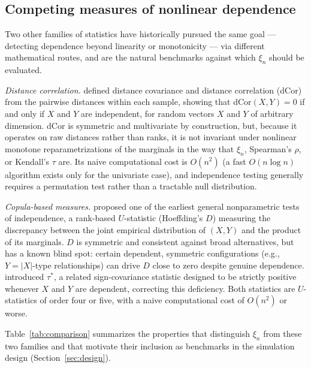 \documentclass[article]{ajs}
\begin{document}
\subsection{Competing measures of nonlinear dependence}

Two other families of statistics have historically pursued the same
goal --- detecting dependence beyond linearity or monotonicity --- via
different mathematical routes, and are the natural benchmarks against
which $\xi_n$ should be evaluated.

\emph{Distance correlation.} \cite{szekely2007} defined distance
covariance and distance correlation (dCor) from the pairwise distances
within each sample, showing that dCor$(X,Y) = 0$ if and only if $X$
and $Y$ are independent, for random vectors $X$ and $Y$ of arbitrary
dimension. dCor is symmetric and multivariate by construction, but,
because it operates on raw distances rather than ranks, it is not
invariant under nonlinear monotone reparametrizations of the marginals
in the way that $\xi_n$, Spearman's $\rho$, or Kendall's $\tau$ are.
Its naive computational cost is $O(n^2)$ (a fast $O(n \log n)$
algorithm exists only for the univariate case), and independence
testing generally requires a permutation test rather than a tractable
null distribution.

\emph{Copula-based measures.} \cite{hoeffding1948} proposed one of the
earliest general nonparametric tests of independence, a rank-based
$U$-statistic (Hoeffding's $D$) measuring the discrepancy between the
joint empirical distribution of $(X,Y)$ and the product of its
marginals. $D$ is symmetric and consistent against broad alternatives,
but has a known blind spot: certain dependent, symmetric configurations
(e.g., $Y = |X|$-type relationships) can drive $D$ close to zero
despite genuine dependence. \cite{bergsma2014} introduced $\tau^\ast$,
a related sign-covariance statistic designed to be strictly positive
whenever $X$ and $Y$ are dependent, correcting this deficiency. Both
statistics are $U$-statistics of order four or five, with a naive
computational cost of $O(n^2)$ or worse.

Table~\ref{tab:comparison} summarizes the properties that distinguish
$\xi_n$ from these two families and that motivate their inclusion as
benchmarks in the simulation design (Section~\ref{sec:design}).
\end{document}
